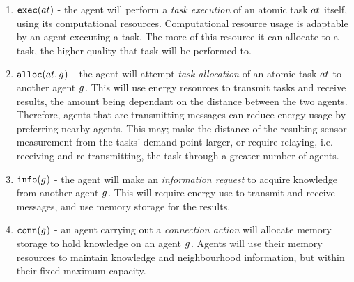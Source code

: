\begin{enumerate}
	\item $\functionExec{}{}$ - the agent will perform a \textit{task execution} of an atomic task $\varAtomicTask{}{}$ itself, using its computational resources. Computational resource usage is adaptable by an agent executing a task. The more of this resource it can allocate to a task, the higher quality that task will be performed to.

	\item $\functionAlloc{}{}$ - the agent will attempt \textit{task allocation} of an atomic task $\varAtomicTask{}{}$ to another agent $g_{}^{}$. This will use energy resources to transmit tasks and receive results, the amount being dependant on the distance between the two agents. Therefore, agents that are transmitting messages can reduce energy usage by preferring nearby agents. This may; make the distance of the resulting sensor measurement from the tasks' demand point larger, or require relaying, i.e. receiving and re-transmitting, the task through a greater number of agents.

	\item  $\functionInfo{}{}$ - the agent will make an \textit{information request} to acquire knowledge from another agent $g_{}^{}$. This will require energy use to transmit and receive messages, and use memory storage for the results. 
	
	\item $\functionLink{}{}$ -  an agent carrying out a \textit{connection action} will allocate memory storage to hold knowledge on an agent $g_{}^{}$.  Agents will use their memory resources to maintain knowledge and neighbourhood information, but within their fixed maximum capacity.
\end{enumerate}

